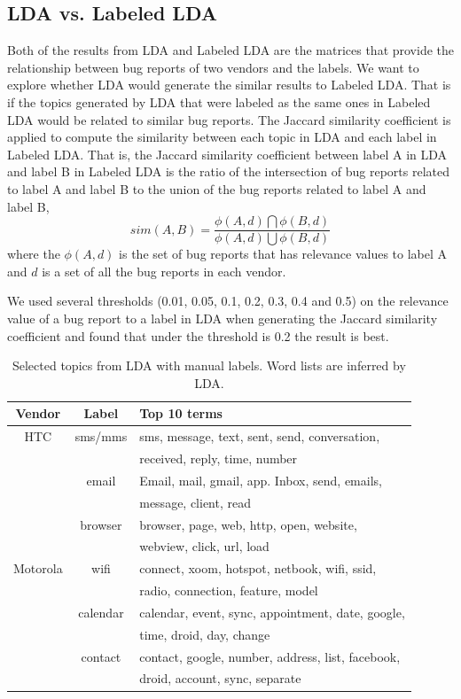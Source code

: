\documentclass[10pt, conference, compsocconf]{IEEEtran}
\begin{document}
\subsection{LDA vs. Labeled LDA}
Both of the results from LDA and Labeled LDA are the matrices that provide the relationship between bug reports of two vendors and the labels. We want to explore whether LDA would generate the similar results to Labeled LDA. That is if the topics generated by LDA that were labeled as the same ones in Labeled LDA would be related to similar bug reports.
The Jaccard similarity coefficient is applied to compute the similarity between each topic in LDA and each label in Labeled LDA. That is, the Jaccard similarity coefficient between label A in LDA and label B in Labeled LDA is the ratio of the intersection of bug reports related to label A and label B to the union of the bug reports related to label A and label B,
\begin{equation}
sim(A,B) = \frac{\phi(A,d)\bigcap\phi(B,d)}{\phi(A,d)\bigcup\phi(B,d)}
\end{equation}
where the $\phi(A,d)$ is the set of bug reports that has relevance values to label A and $d$ is a set of all the bug reports in each vendor.

We used several thresholds (0.01, 0.05, 0.1, 0.2, 0.3, 0.4 and 0.5) on the relevance value of a bug report to a label in LDA when generating the Jaccard similarity coefficient and found that under the threshold is 0.2 the result is best.

\begin{table}[!t]
\renewcommand{\arraystretch}{1.3}
\caption{Selected topics from LDA with manual labels. Word lists are inferred by LDA.}
\label{seleted2}
\centering
\begin{tabular}{|c||c||l|}
\hline
Vendor & Label & Top 10 terms\\
\hline
HTC & sms\//mms &sms, message, text, sent, send, conversation, \\
            && received, reply, time, number \\ \cline{2-3}
  & email & Email, mail, gmail, app. Inbox, send, emails, \\
            &&message, client, read \\ \cline{2-3}
  & browser&browser, page, web, http, open, website, \\
            &&webview, click, url, load\\
\hline
Motorola & wifi &connect, xoom, hotspot, netbook, wifi, ssid, \\
           &&radio, connection, feature, model\\ \cline{2-3}
    &calendar& calendar, event, sync, appointment, date, google, \\
           &&time, droid, day, change \\ \cline{2-3}
    &contact & contact, google, number, address, list, facebook, \\
           &&droid, account, sync, separate \\
\hline
\end{tabular}
\end{table}
\end{document}
